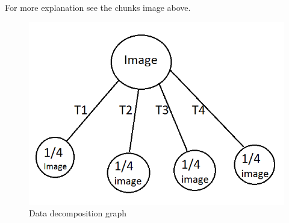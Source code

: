 \documentclass[paper=a4, fontsize=11pt]{scrartcl} %
\numberwithin{equation}{section} %
\numberwithin{figure}{section} %
\numberwithin{table}{section} %
\begin{document}
For more explanation see the chunks image above.

\begin{figure}[H]
	\centering
	\includegraphics[scale=0.5]{"Data decomp2"}
	\caption{Data decomposition graph}
        \label{kernels}
\end{figure}
\end{document}
